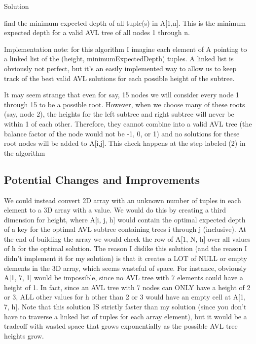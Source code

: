 \documentclass[a4paper]{article}
\begin{document}
Solution
\begin{myEnumerate}
\item  find the minimum expected depth of all tuple(s) in A[1,n]. This is the minimum expected depth for a valid AVL tree of all nodes 1 through n.
\end{myEnumerate}

Implementation note: for this algorithm I imagine each element of A pointing to a linked list of the (height, minimumExpectedDepth) tuples. A linked list is obviously not perfect, but it's an easily implemented way to allow us to keep track of the best valid AVL solutions for each possible height of the subtree.

It may seem strange that even for say, 15 nodes we will consider every node 1 through 15 to be a possible root. However, when we choose many of these roots (say, node 2), the heights for the left subtree and right subtree will never be within 1 of each other. Therefore, they cannot combine into a valid AVL tree (the balance factor of the node would not be -1, 0, or 1) and no solutions for these root nodes will be added to A[i,j].
This check happens at the step labeled (2) in the algorithm

    
\subsection{Potential Changes and Improvements}
We could instead convert 2D array with an unknown number of tuples in each element to a 3D array with a value. We would do this by creating a third dimension for height, where A[i, j, h] would contain the optimal expected depth of a key for the optimal AVL subtree containing trees i through j (inclusive). At the end of building the array we would check the row of A[1, N, h] over all values of h for the optimal solution. The reason I dislike this solution (and the reason I didn't implement it for my solution) is that it creates a LOT of NULL or empty elements in the 3D array, which seems wasteful of space. For instance, obviously A[1, 7, 1] would be impossible, since no AVL tree with 7 elements could have a height of 1. In fact, since an AVL tree with 7 nodes can ONLY have a height of 2 or 3, ALL other values for h other than 2 or 3 would have an empty cell at A[1, 7, h]. 
Note that this solution IS strictly faster than my solution (since you don't have to traverse a linked list of tuples for each array element), but it would be a tradeoff with wasted space that grows exponentially as the possible AVL tree heights grow.
\end{document}
